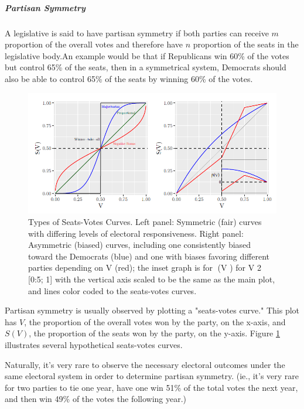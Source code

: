 \subparagraph{Partisan Symmetry}

A legislative is said to have partisan symmetry if both parties can receive $m$ proportion of the overall votes and therefore have $n$ proportion of the seats in the legislative body.An example would be that if Republicans win 60\% of the votes but control 65\% of the seats, then in a symmetrical system, Democrats should also be able to control 65\% of the seats by winning 60\% of the votes. \textcite{katz2020}

\begin{figure}
    \includegraphics[width=\linewidth]{img/seatsvotes.png}
    \caption{Types of Seats-Votes Curves. Left panel: Symmetric (fair) curves with differing
    levels of electoral responsiveness. Right panel: Asymmetric (biased) curves, including
    one consistently biased toward the Democrats (blue) and one with biases favoring different
    parties depending on V (red); the inset graph is for (V ) for V 2 [0:5; 1] with the vertical
    axis scaled to be the same as the main plot, and lines color coded to the seats-votes curves. \parencite[175]{katz2020}}
    \label{fig:seatsvotes1}
\end{figure}

Partisan symmetry is usually observed by plotting a "seats-votes curve." This plot has $V$, the proportion of the overall votes won by the party, on the x-axis, and $S(V)$, the proportion of the seats won by the party, on the y-axis. Figure \ref{fig:seatsvotes1} \parencite[175]{katz2020} illustrates several hypothetical seats-votes curves.

Naturally, it's very rare to observe the necessary electoral outcomes under the same electoral system in order to determine partisan symmetry. (ie., it's very rare for two parties to tie one year, have one win 51\% of the total votes the next year, and then win 49\% of the votes the following year.)

